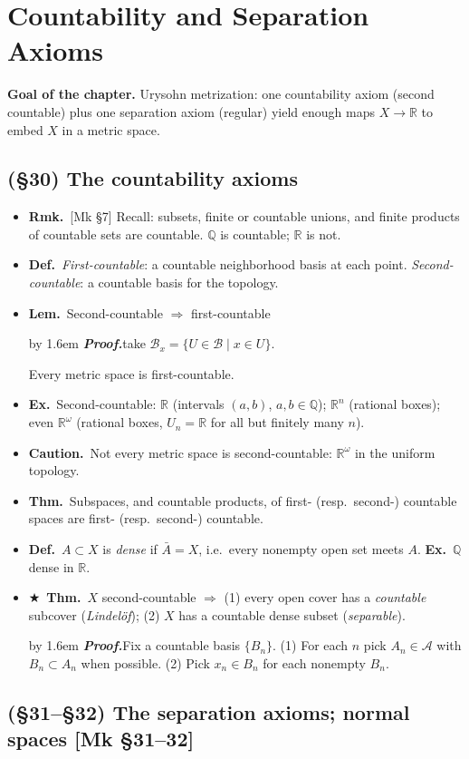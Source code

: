 \documentclass[12pt,a4paper]{article}
\newcommand{\Dfn}{\textbf{Def.}~}
\newcommand{\Thm}{\textbf{Thm.}~}
\newcommand{\Lem}{\textbf{Lem.}~}
\newcommand{\Exa}{\textbf{Ex.}~}
\newcommand{\Rmk}{\textbf{Rmk.}~}
\newcommand{\Warn}{\textbf{Caution.}~}
\newcommand{\Key}{$\bigstar$~}                  %
\newcommand{\Mk}[1]{{\footnotesize\textcolor{cue}{[Mk #1]}}}  %
\newcommand{\Pf}[1]{%
  \par\addvspace{7pt}\nopagebreak
  \begingroup
    \advance\leftskip by 1.6em
    \parindent=0pt \small\color{prf}%
    \textbf{\textit{Proof.}}\enspace #1\par
  \endgroup
  \addvspace{9pt}}
\newenvironment{BL}%
  {\begin{itemize}[leftmargin=1.4em,labelsep=0.55em,itemsep=11pt,topsep=11pt,parsep=0pt]}%
  {\end{itemize}}
\newcommand{\RR}{\mathbb{R}}
\newcommand{\QQ}{\mathbb{Q}}
\newcommand{\cB}{\mathcal{B}}
\newcommand{\cA}{\mathcal{A}}
\newcommand{\imp}{\Rightarrow}
\begin{document}
\section{Countability and Separation Axioms}

\textbf{Goal of the chapter.} Urysohn metrization: one countability axiom (second countable)
plus one separation axiom (regular) yield enough maps $X\to\RR$ to embed $X$ in a metric space.

\subsection{(\S30) The countability axioms}

\begin{BL}
\item \Rmk \Mk{\S7} Recall: subsets, finite or countable unions, and finite products of
      countable sets are countable. $\QQ$ is countable; $\RR$ is not.
\item \Dfn \emph{First-countable}: a countable neighborhood basis at each point.
      \emph{Second-countable}: a countable basis for the topology.
\item \Lem Second-countable $\imp$ first-countable
      \Pf{take $\cB_x=\{U\in\cB\mid x\in U\}$.}
      \quad Every metric space is first-countable.
\item \Exa Second-countable: $\RR$ (intervals $(a,b)$, $a,b\in\QQ$);
      $\RR^n$ (rational boxes);
      even $\RR^\omega$ (rational boxes, $U_n=\RR$ for all but finitely many $n$).
\item \Warn Not every metric space is second-countable: $\RR^\omega$ in the uniform topology.
\item \Thm Subspaces, and countable products, of first- (resp.\ second-) countable spaces are
      first- (resp.\ second-) countable.
\item \Dfn $A\subset X$ is \emph{dense} if $\bar A=X$, i.e.\ every nonempty open set meets $A$.
      \Exa $\QQ$ dense in $\RR$.
\item \Key\Thm $X$ second-countable $\imp$
      (1) every open cover has a \emph{countable} subcover (\emph{Lindel\"of});
      (2) $X$ has a countable dense subset (\emph{separable}).
\Pf{Fix a countable basis $\{B_n\}$. (1) For each $n$ pick $A_n\in\cA$ with $B_n\subset A_n$
when possible. (2) Pick $x_n\in B_n$ for each nonempty $B_n$.}
\end{BL}

\subsection{(\S31--\S32) The separation axioms; normal spaces \Mk{\S31--32}}
\end{document}
